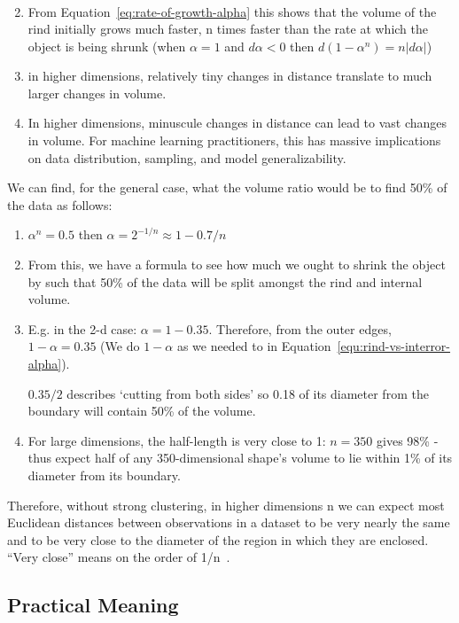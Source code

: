 \documentclass[11pt]{article}
\begin{document}
\begin{enumerate}
\begin{align}
          \end{align}
    \item From Equation~\ref{eq:rate-of-growth-alpha} this shows that the volume of the rind initially grows much faster, n times faster than the rate at which the object is being shrunk (when $\alpha=1$ and $d\alpha < 0$ then $d(1-\alpha^n)=n|d\alpha|$)
    \item in higher dimensions, relatively tiny changes in distance translate to much larger changes in volume.
    \item In higher dimensions, minuscule changes in distance can lead to vast changes in volume. For machine learning practitioners, this has massive implications on data distribution, sampling, and model generalizability.
\end{enumerate}

We can find, for the general case, what the volume ratio would be to find 50\% of the data as follows:

\begin{enumerate}
    \item $\alpha^n = 0.5$ then $\alpha = 2^{-1/n} \approx 1 - 0.7 / n$
    \item From this, we have a formula to see how much we ought to shrink the object by such that 50\% of the data will be split amongst the rind and internal volume.
    \item E.g. in the 2-d case: $\alpha = 1 - 0.35$. Therefore, from the outer edges, $1 - \alpha = 0.35$ (We do $1 - \alpha$ as we needed to in Equation~\ref{equ:rind-vs-interror-alpha}).

          $0.35/2$ describes `cutting from both sides' so 0.18 of its diameter from the boundary will contain 50\% of the volume.
    \item For large dimensions, the half-length is very close to 1: $n=350$ gives 98\% - thus expect half of any 350-dimensional shape's volume to lie within 1\% of its diameter from its boundary.
\end{enumerate}

Therefore, without strong clustering, in higher dimensions n we can expect most Euclidean distances between observations in a dataset to be very nearly the same and to be very close to the diameter of the region in which they are enclosed. ``Very close'' means on the order of 1/n~\cite{stackexchangeMathematicalDemonstration}.

\subsection{Practical Meaning}
\end{document}
